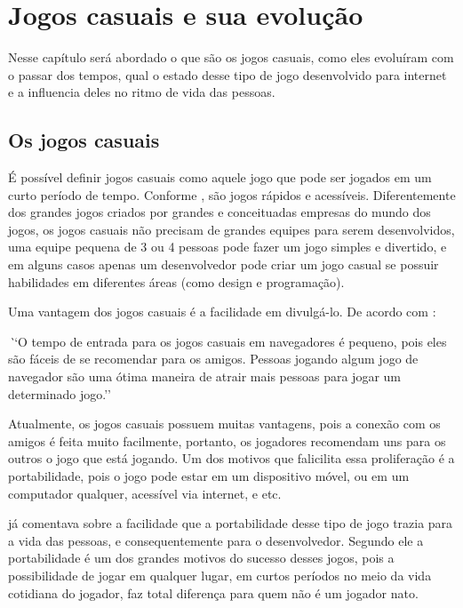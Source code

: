 \section{Jogos casuais e sua evolução}

Nesse capítulo será abordado o que são os jogos casuais, como eles
evoluíram com o passar dos tempos, qual o estado desse tipo de jogo
desenvolvido para internet e a influencia deles no ritmo de vida das
pessoas.

\subsection{Os jogos casuais}

É possível definir jogos casuais como aquele jogo que pode ser jogados em um curto período
de tempo. Conforme , são jogos rápidos e acessíveis.
Diferentemente dos grandes jogos criados por grandes e conceituadas
empresas do mundo dos jogos, os jogos casuais não precisam de grandes
equipes para serem desenvolvidos, uma equipe pequena de 3 ou 4 pessoas
pode fazer um jogo simples e divertido, e em alguns casos apenas um
desenvolvedor pode criar um jogo casual se possuir habilidades em
diferentes áreas (como design e programação).

Uma vantagem dos jogos casuais é a facilidade em divulgá-lo. De acordo com
:

\begin{singlespacing}
\begin{citacao}{4cm}{0cm}\footnotesize \emph
    ``O tempo de entrada para os jogos casuais em navegadores é pequeno,
    pois eles são fáceis de se recomendar para os amigos. Pessoas jogando
    algum jogo de navegador são uma ótima maneira de atrair mais
    pessoas para jogar um determinado jogo.''
\end{citacao}
\end{singlespacing}

Atualmente, os jogos casuais possuem muitas vantagens, pois a conexão
com os amigos é feita muito facilmente, portanto, os jogadores
recomendam uns para os outros o jogo que está jogando. Um dos motivos
que falicilita essa proliferação é a portabilidade, pois o jogo pode
estar em um dispositivo móvel, ou em um computador qualquer, acessível
via internet, e etc.

\cite{ozcan2010recent} já comentava sobre a facilidade que a
portabilidade desse tipo de jogo trazia para a vida das pessoas, e
consequentemente para o desenvolvedor. Segundo ele a portabilidade é um
dos grandes motivos do sucesso desses jogos, pois a possibilidade de
jogar em qualquer lugar, em curtos períodos no meio da vida cotidiana
do jogador, faz total diferença para quem não é um jogador nato.

